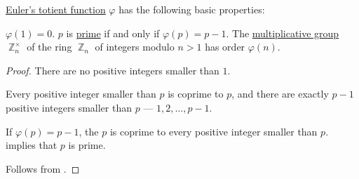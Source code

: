 \begin{proposition}\label{thm:def:eulers_totient_function}
  \hyperref[def:eulers_totient_function]{Euler's totient function} \( \varphi \) has the following basic properties:
  \begin{thmenum}
     \( \varphi(1) = 0 \).
     \( p \) is \hyperref[def:prime_number]{prime} if and only if \( \varphi(p) = p - 1 \).
     The \hyperref[def:semiring]{multiplicative group} \( \BbbZ_n^\times \) of the ring \hyperref[def:ring_of_integers_modulo]{\( \BbbZ_n \)} of integers modulo \( n > 1 \) has order \( \varphi(n) \).
  \end{thmenum}
\end{proposition}
\begin{proof}
   There are no positive integers smaller than \( 1 \).


  \SufficiencySubProof* Every positive integer smaller than \( p \) is coprime to \( p \), and there are exactly \( p - 1 \) positive integers smaller than \( p \) --- \( 1, 2, \ldots, p - 1 \).

  \NecessitySubProof* If \( \varphi(p) = p - 1 \), the \( p \) is coprime to every positive integer smaller than \( p \).  implies that \( p \) is prime.

   Follows from .
\end{proof}

